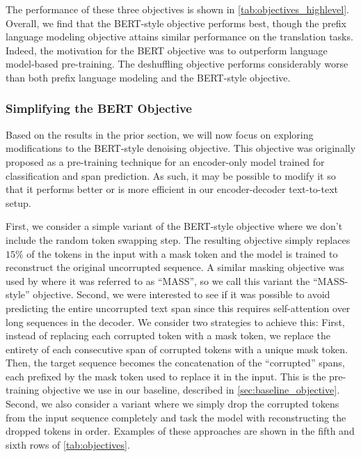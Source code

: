 \documentclass[twoside,11pt]{article}
\begin{document}
The performance of these three objectives is shown in \cref{tab:objectives_highlevel}.
Overall, we find that the BERT-style objective performs best, though the prefix language modeling objective attains similar performance on the translation tasks.
Indeed, the motivation for the BERT objective was to outperform language model-based pre-training.
The deshuffling objective performs considerably worse than both prefix language modeling and the BERT-style objective.

\subsubsection{Simplifying the BERT Objective}
\label{sec:simplifying_bert}

Based on the results in the prior section, we will now focus on exploring modifications to the BERT-style denoising objective.
This objective was originally proposed as a pre-training technique for an encoder-only model trained for classification and span prediction.
As such, it may be possible to modify it so that it performs better or is more efficient in our encoder-decoder text-to-text setup.

First, we consider a simple variant of the BERT-style objective where we don't include the random token swapping step.
The resulting objective simply replaces $15\%$ of the tokens in the input with a mask token and the model is trained to reconstruct the original uncorrupted sequence.
A similar masking objective was used by \cite{song2019mass} where it was referred to as ``MASS'', so we call this variant the ``MASS-style'' objective.
Second, we were interested to see if it was possible to avoid predicting the entire uncorrupted text span since this requires self-attention over long sequences in the decoder.
We consider two strategies to achieve this:
First, instead of replacing each corrupted token with a mask token, we replace the entirety of each consecutive span of corrupted tokens with a unique mask token.
Then, the target sequence becomes the concatenation of the ``corrupted'' spans, each prefixed by the mask token used to replace it in the input.
This is the pre-training objective we use in our baseline, described in \cref{sec:baseline_objective}.
Second, we also consider a variant where we simply drop the corrupted tokens from the input sequence completely and task the model with reconstructing the dropped tokens in order.
Examples of these approaches are shown in the fifth and sixth rows of \cref{tab:objectives}.
\end{document}
